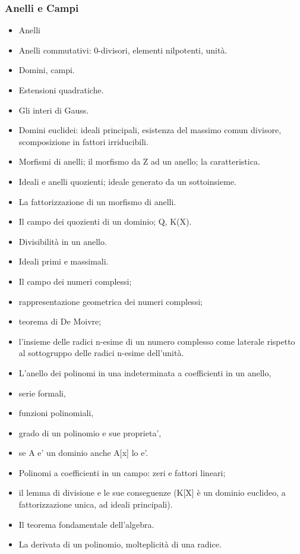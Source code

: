 \documentclass[a4paper,10pt]{article}
\begin{document}
 \subsubsection*{Anelli e Campi}
 \begin{itemize}
   \item Anelli
 \item Anelli commutativi: 0-divisori, elementi nilpotenti, unità.
 \item Domini, campi. 
 \item Estensioni quadratiche. 
 \item Gli interi di Gauss. 
 \item Domini euclidei:  ideali principali, esistenza del massimo comun divisore, scomposizione in fattori irriducibili. 
 \item Morfismi di anelli; il morfismo da Z ad un anello; la caratteristica. 
 \item Ideali e anelli quozienti; ideale generato da un sottoinsieme. 
 \item La fattorizzazione di un morfismo di anelli. 
 \item Il campo dei quozienti di un dominio; Q, K(X). 
 \item Divisibilità in un anello. 
 \item Ideali primi e massimali.
 \item Il campo dei numeri complessi;
 \item rappresentazione geometrica dei numeri complessi; 
 \item teorema di De Moivre; 
 \item l'insieme delle radici n-esime di un numero complesso come laterale rispetto al sottogruppo delle radici n-esime dell'unità.
 \item L'anello dei polinomi in una indeterminata a coefficienti in un anello, 
 \item serie formali, 
 \item funzioni polinomiali, 
 \item grado di un polinomio e sue proprieta', 
 \item se A e' un dominio anche A[x] lo e'. 
 \item Polinomi a coefficienti in un campo: zeri e fattori lineari; 
 \item il lemma di divisione e le sue conseguenze (K[X] è un dominio euclideo, a fattorizzazione unica, ad ideali principali). 
 \item Il teorema fondamentale dell'algebra. 
 \item La derivata di un polinomio, molteplicità di una radice. 

\end{itemize}
\end{document}
